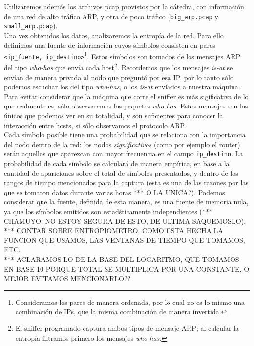 Utilizaremos adem\'as los archivos pcap provistos por la c\'atedra, con informaci\'on de una red de alto tr\'afico ARP, y otra de poco tr\'afico (\texttt{big\_arp.pcap} y \texttt{small\_arp.pcap}).\\

Una vez obtenidos los datos, analizaremos la entrop\'ia de la red. Para ello definimos una fuente de informaci\'on cuyos s\'imbolos consisten en pares \texttt{<ip\_fuente, ip\_destino>}\footnote{Consideramos los pares de manera ordenada, por lo cual no es lo mismo una combinaci\'on de IPs, que la misma combinaci\'on de manera invertida.}. Estos s\'imbolos son tomados de los mensajes ARP del tipo \emph{who-has} que env\'ia cada host\footnote{El sniffer programado captura ambos tipos de mensaje ARP; al calcular la entrop\'ia filtramos primero los mensajes \emph{who-has}.}. Recordemos que los mensajes \emph{is-at} se env\'ian de manera privada al nodo que pregunt\'o por esa IP, por lo tanto s\'olo podemos escuchar los del tipo \emph{who-has}, o los \emph{is-at} env\'iados a nuestra m\'aquina. Para evitar considerar que la m\'aquina que corre el sniffer es m\'as sigificativa de lo que realmente es, s\'olo observaremos los paquetes \emph{who-has}. Estos mensajes son los \'unicos que podemos ver en su totalidad, y son suficientes para conocer la interacci\'on entre hosts, si s\'olo observamos el protocolo ARP. \\

Cada s\'imbolo posible tiene una probabilidad que se relaciona con la importancia del nodo dentro de la red: los nodos \emph{significativos} (como por ejemplo el router) ser\'an aquellos que aparezcan con mayor frecuencia en el campo \texttt{ip\_destino}. La probabilidad de cada s\'imbolo se calcular\'a de manera emp\'irica, en base a la cantidad de apariciones sobre el total de s\'imbolos presentados, y dentro de los rangos de tiempo mencionados para la captura (esta es una de las razones por las que se tomaron datos durante varias horas *** O LA UNICA?). Podemos considerar que la fuente, definida de esta manera, es una fuente de memoria nula, ya que los s\'imbolos emitidos son estad\'sticamente independientes (*** CHAMUYO, NO ESTOY SEGURA DE ESTO, DE ULTIMA SAQUEMOSLO).\\

*** CONTAR SOBRE ENTROPIOMETRO, COMO ESTA HECHA LA FUNCION QUE USAMOS, LAS VENTANAS DE TIEMPO QUE TOMAMOS, ETC.\\
*** ACLARAMOS LO DE LA BASE DEL LOGARITMO, QUE TOMAMOS EN BASE 10 PORQUE TOTAL SE MULTIPLICA POR UNA CONSTANTE, O MEJOR EVITAMOS MENCIONARLO??



